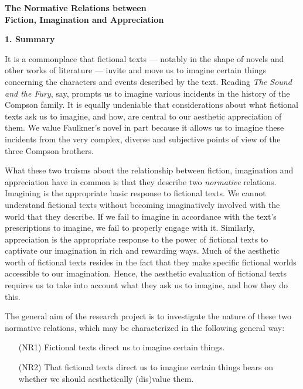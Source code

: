 \begin{center}
\noindent\textbf{\large The Normative Relations between\\ Fiction, Imagination and
Appreciation}
\end{center}


\noindent\textbf{\large 1. Summary}
\vspace{.1cm}

\noindent It is a commonplace that fictional texts --- notably in the shape of novels and other works of literature --- invite and move us to imagine certain things concerning the characters and events described by the text. Reading \emph{The Sound and the Fury}, say, prompts us to imagine various incidents in the history of the Compson family. It is equally undeniable that considerations about what fictional texts ask us to imagine, and how, are central to our aesthetic appreciation of them. We value Faulkner's novel in part because it allows us to imagine these incidents from the very complex, diverse and subjective points of view of the three Compson brothers.

What these two truisms about the relationship between fiction, imagination and appreciation have in common is that they describe two \emph{normative} relations. Imagining is the appropriate basic response to fictional texts. We cannot understand fictional texts without becoming imaginatively involved with the world that they describe. If we fail to imagine in accordance with the text's prescriptions to imagine, we fail to properly engage with it. Similarly, appreciation is the appropriate response to the power of fictional texts to captivate our imagination in rich and rewarding ways. Much of the aesthetic worth of fictional texts resides in the fact that they make specific fictional worlds accessible to our imagination. Hence, the aesthetic evaluation of fictional texts requires us to take into account what they ask us to imagine, and how they do this.

The general aim of the research project is to investigate the nature of these two normative relations, which may be characterized in the following general way:


\vspace{-.1cm}
\begin{itemize}[leftmargin=2cm]
\item[{(NR1)}] Fictional texts direct us to imagine certain things.
\vspace{-.2cm}
\item[{(NR2)}] That fictional texts direct us to imagine certain things bears on whether we should aesthetically (dis)value them. 
\end{itemize}
\vspace{-.1cm}


